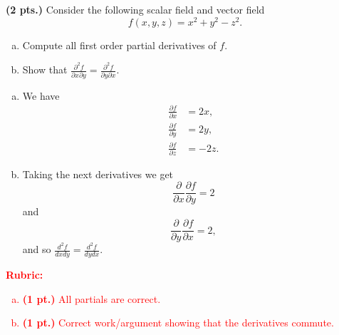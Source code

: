 \documentclass[12pt]{article} %
\begin{document}
\newpage
\begin{problem}
\textbf{(2 pts.)} Consider the following scalar field and vector field
\[
f(x,y,z) = x^2+y^2-z^2.
\]
\begin{enumerate}[(a)]
    \item Compute all first order partial derivatives of $f$.
    \item Show that $\frac{\partial^2 f}{\partial x \partial y} = \frac{\partial^2 f}{\partial y \partial x}$.
\end{enumerate}
\end{problem}
\begin{solution}
\begin{enumerate}[(a)]
    \item We have
    \begin{align*}
        \frac{\partial f}{\partial x} &= 2x, \\
        \frac{\partial f}{\partial y} &= 2y, \\
        \frac{\partial f}{\partial z} &= -2z.
    \end{align*}
    \item Taking the next derivatives we get
    \[
        \frac{\partial }{\partial x} \frac{\partial f}{\partial y} = 2
    \]
    and
    \[
        \frac{\partial}{\partial y}\frac{\partial f}{\partial x} = 2,
    \]
    and so $\frac{d^2 f}{d x d y} = \frac{d^2 f}{d y d x}$.


\end{enumerate}
\end{solution}
\textcolor{red}{
\noindent \textbf{Rubric:}}
\textcolor{red}{
\begin{enumerate}[(a)]
\item \textbf{(1 pt.)} All partials are correct.
\item \textbf{(1 pt.)} Correct work/argument showing that the derivatives commute.
\end{enumerate}
}
\end{document}
